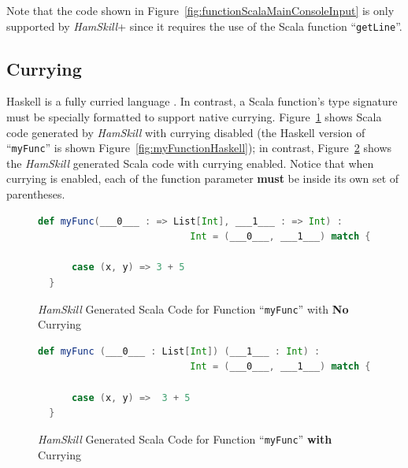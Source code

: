 \documentclass{report}
\begin{document}
Note that the code shown in Figure~\ref{fig:functionScalaMainConsoleInput} is only supported by \textit{HamSkill}+ since it requires the use of the Scala function ``\texttt{getLine}''.

\subsection{Currying}\label{sec:currying}

Haskell is a fully curried language \cite{learnYouAHaskell}.  In contrast, a Scala function's type signature must be specially formatted to support native currying. Figure~\ref{fig:myFuncInScalaNoCurrying} shows Scala code generated by \textit{HamSkill} with currying disabled (the Haskell version of ``\texttt{myFunc}'' is shown Figure~\ref{fig:myFunctionHaskell}); in contrast, Figure~\ref{fig:myFuncInScalaWithCurrying} shows the \textit{HamSkill} generated Scala code with currying enabled.  Notice that when currying is enabled, each of the function parameter \textbf{must} be inside its own set of parentheses.

\begin{figure}[H]
\begin{mdframed}
\begin{lstlisting}[basicstyle=\small, language=scala]
  def myFunc(___0___ : => List[Int], ___1___ : => Int) : 
                           Int = (___0___, ___1___) match {
      
      case (x, y) => 3 + 5
  } 
\end{lstlisting}
\end{mdframed}
\caption{\textit{HamSkill} Generated Scala Code for Function ``\texttt{myFunc}'' with \textbf{No} Currying}\label{fig:myFuncInScalaNoCurrying}
\end{figure}

\begin{figure}[H]
\begin{mdframed}
\begin{lstlisting}[basicstyle=\small, language=scala]
  def myFunc (___0___ : List[Int]) (___1___ : Int) :  
                           Int = (___0___, ___1___) match {
      
      case (x, y) =>  3 + 5
  }
\end{lstlisting}
\end{mdframed}
\caption{\textit{HamSkill} Generated Scala Code for Function ``\texttt{myFunc}'' \textbf{with} Currying}\label{fig:myFuncInScalaWithCurrying}
\end{figure}
\end{document}
